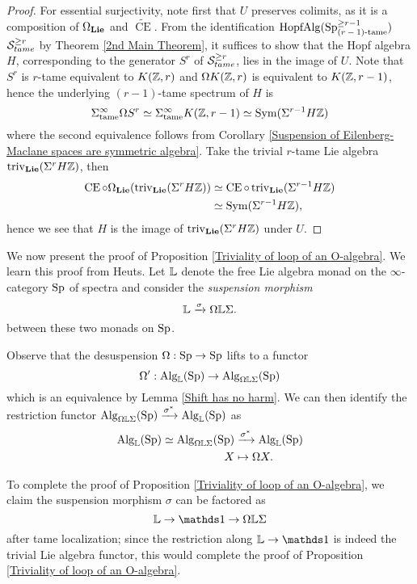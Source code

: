 \begin{proof}
    For essential surjectivity, note first that  $U$ preserves colimits, as it is a composition of $\Omega_{\mathbf{Lie}}$ and $\widetilde{\operatorname{CE}}$. 
    From the identification $\operatorname{HopfAlg}(\operatorname{Sp}^{\geq r-1}_{\text{($r-1$)-tame}})$ ${\mathcal{S}}^{\geq r}_{tame}$ by Theorem \ref{2nd Main Theorem},
    it suffices to show that the Hopf algebra $H$, corresponding to the generator $S^r$ of ${\mathcal{S}}^{\geq r}_{tame}$, lies in the image of $U$. 
    Note that $S^{r}$ is $r$-tame equivalent to $K({\mathbb{Z}}, r)$ and $\Omega K({\mathbb{Z}}, r)$ is  equivalent to $K({\mathbb{Z}}, r-1)$, hence the underlying $(r-1)$-tame spectrum of $H$ is 
    $$
    \Sigma^{\infty}_{\operatorname{tame}}\Omega S^{r}
    \simeq 
    \Sigma^{\infty}_{\operatorname{tame}} K({\mathbb{Z}}, r-1)
    \simeq \operatorname{Sym}(\Sigma^{r-1}H{\mathbb{Z}})
    $$ 
    where the second equivalence follows from Corollary \ref{Suspension of Eilenberg-Maclane spaces are symmetric algebra}.
    Take the trivial $r$-tame Lie algebra $\operatorname{triv}_{\mathbf{Lie}}(\Sigma^{r}H{\mathbb{Z}})$, then
    \begin{align*}
        \operatorname{CE}\circ  \Omega_{\mathbf{Lie}}(\operatorname{triv}_{\mathbf{Lie}}(\Sigma^{r}H{\mathbb{Z}}))
        & \simeq 
        \operatorname{CE}\circ \operatorname{triv}_{\mathbf{Lie}} (\Sigma^{r-1}H{\mathbb{Z}})\\
        & \simeq \operatorname{Sym}(\Sigma^{r-1}H{\mathbb{Z}}),
    \end{align*}
    hence we see that $H$ is the image of $\operatorname{triv}_{\mathbf{Lie}}(\Sigma^{r}H{\mathbb{Z}})$ under $U$.
    
\end{proof}

We now present the proof of Proposition \ref{Triviality of loop of an O-algebra}.
We learn this proof from Heuts. 
Let ${\mathbb{L}}$ denote the free Lie algebra monad on the $\infty$-category $\operatorname{Sp}$ of spectra and consider the 
\emph{suspension morphism}
\[
{\mathbb{L}} \xrightarrow{\sigma} \Omega {\mathbb{L}} \Sigma.
\]
between these two monads on $\operatorname{Sp}$.

Observe that the desuspension $\Omega:\operatorname{Sp} \to \operatorname{Sp}$ lifts to a functor 
$$
\Omega':  \operatorname{Alg}_{{\mathbb{L}}}(\operatorname{Sp}) \to \operatorname{Alg}_{\Omega {\mathbb{L}} \Sigma}(\operatorname{Sp})
$$
which is an equivalence by Lemma \ref{Shift has no harm}.
We can then identify the restriction functor $\operatorname{Alg}_{ \Omega {\mathbb{L}} \Sigma}(\operatorname{Sp})\xrightarrow{\sigma^{*}} \operatorname{Alg}_{{\mathbb{L}}}(\operatorname{Sp})$ as
\begin{align*}
	\operatorname{Alg}_{{\mathbb{L}}}(\operatorname{Sp})\simeq \operatorname{Alg}_{\Omega{\mathbb{L}}\Sigma}(\operatorname{Sp}) & \xrightarrow{\sigma^*} \operatorname{Alg}_{\mathbb{L}}(\operatorname{Sp})\\
	X & \mapsto \Omega X.
\end{align*}

To complete the proof of Proposition \ref{Triviality of loop of an O-algebra},
we claim the suspension morphism $\sigma$ can be factored as 
$$
\BL \to \triv 
\to 
\Omega \BL \Sigma
$$
after tame localization;
since the restriction along $\BL \to \triv$ is indeed the trivial Lie algebra functor, this would complete the proof of Proposition \ref{Triviality of loop of an O-algebra}.

